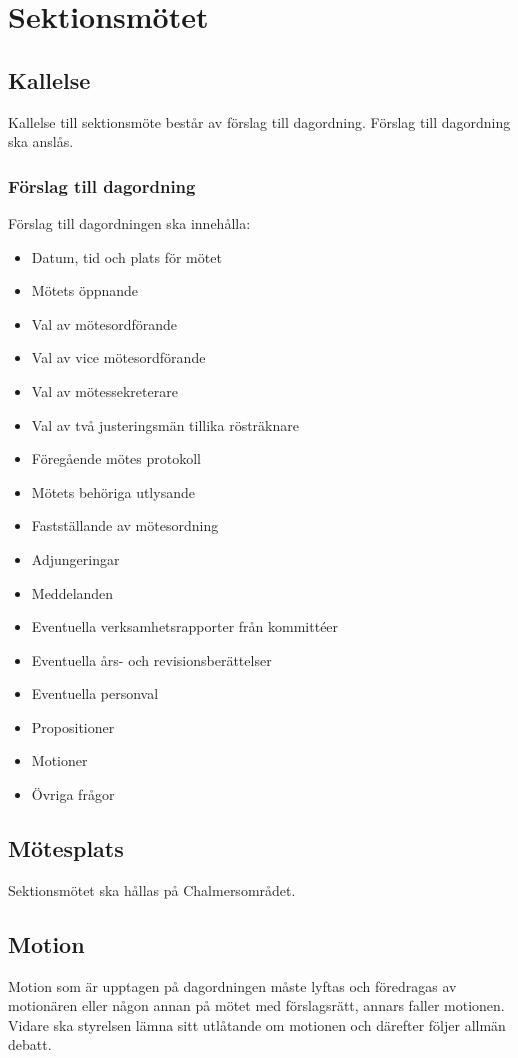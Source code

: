 \section{Sektionsmötet}

\subsection{Kallelse} 
Kallelse till sektionsmöte består av förslag till dagordning. Förslag till
dagordning ska anslås.

\subsubsection{Förslag till dagordning}
Förslag till dagordningen ska innehålla:
\begin{itemize}  
  \item Datum, tid och plats för mötet 
  \item Mötets öppnande 
  \item Val av mötesordförande
  \item Val av vice mötesordförande
  \item Val av mötessekreterare 
  \item Val av två justeringsmän tillika rösträknare 
  \item Föregående mötes protokoll
  \item Mötets behöriga utlysande 
  \item Fastställande av mötesordning 
  \item Adjungeringar 
  \item Meddelanden 
  \item Eventuella verksamhetsrapporter från kommittéer 
  \item Eventuella års- och revisionsberättelser 
  \item Eventuella personval 
  \item Propositioner 
  \item Motioner 
  \item Övriga frågor 
\end{itemize}
\subsection{Mötesplats} 
Sektionsmötet ska hållas på Chalmersområdet.
\subsection{Motion}
Motion som är upptagen på dagordningen måste lyftas och föredragas av motionären eller någon annan på mötet med förslagsrätt, annars faller motionen. Vidare ska styrelsen lämna sitt utlåtande om motionen och därefter följer allmän debatt.

\newpage


